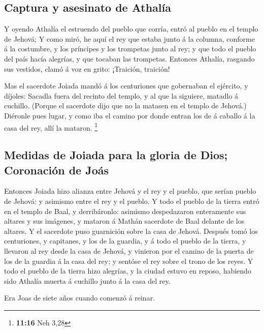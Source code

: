 \hypertarget{captura-y-asesinato-de-athaluxeda}{%
\subsection{Captura y asesinato de
Athalía}\label{captura-y-asesinato-de-athaluxeda}}

 Y oyendo Athalía el estruendo del pueblo que corría, entró
al pueblo en el templo de Jehová;  Y como miró, he aquí el
rey que estaba junto á la columna, conforme á la costumbre, y los
príncipes y los trompetas junto al rey; y que todo el pueblo del país
hacía alegrías, y que tocaban las trompetas. Entonces Athalía, rasgando
sus vestidos, clamó á voz en grito: ¡Traición, traición!

 Mas el sacerdote Joiada mandó á los centuriones que
gobernaban el ejército, y díjoles: Sacadla fuera del recinto del templo,
y al que la siguiere, matadlo á cuchillo. (Porque el sacerdote dijo que
no la matasen en el templo de Jehová.)  Diéronle pues
lugar, y como iba el camino por donde entran los de á caballo á la casa
del rey, allí la mataron. \footnote{\textbf{11:16} Neh 3,28}

\hypertarget{medidas-de-joiada-para-la-gloria-de-dios-coronaciuxf3n-de-jouxe1s}{%
\subsection{Medidas de Joiada para la gloria de Dios; Coronación de
Joás}\label{medidas-de-joiada-para-la-gloria-de-dios-coronaciuxf3n-de-jouxe1s}}

 Entonces Joiada hizo alianza entre Jehová y el rey y el
pueblo, que serían pueblo de Jehová: y asimismo entre el rey y el
pueblo.  Y todo el pueblo de la tierra entró en el templo
de Baal, y derribáronlo: asimismo despedazaron enteramente sus altares y
sus imágenes, y mataron á Mathán sacerdote de Baal delante de los
altares. Y el sacerdote puso guarnición sobre la casa de Jehová.
 Después tomó los centuriones, y capitanes, y los de la
guardia, y á todo el pueblo de la tierra, y llevaron al rey desde la
casa de Jehová, y vinieron por el camino de la puerta de los de la
guardia á la casa del rey; y sentóse el rey sobre el trono de los reyes.
 Y todo el pueblo de la tierra hizo alegrías, y la ciudad
estuvo en reposo, habiendo sido Athalía muerta á cuchillo junto á la
casa del rey.

 Era Joas de siete años cuando comenzó á reinar.

